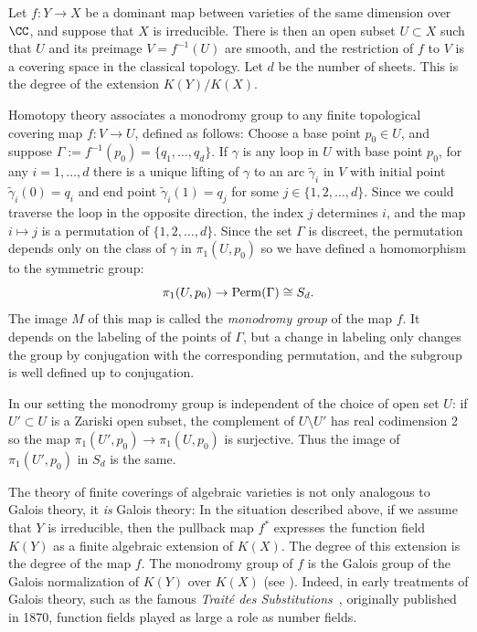 Let $f : Y \to X$ be a dominant map between varieties of the same dimension over $\CC$, and suppose that $X$ is irreducible. There is then an open subset $U \subset X$ such that $U$ and 
its preimage $V = f^{-1}(U)$ are smooth, and the restriction of $f$ to $V$ is a covering space in the classical topology. Let $d$ be the number of sheets. This is the degree of the extension $K(Y)/K(X)$. %

Homotopy theory  associates a monodromy group to any finite topological covering map $f : V \to U$, defined as follows: Choose a base point $p_0 \in U$, and suppose $\Gamma := f^{-1}(p_0)  = \{q_1,\dots,q_d\}$. If $\gamma$ is any loop in $U$ with base point $p_0$, for any $i = 1, \dots, d$ there is a unique lifting of $\gamma$ to an arc $\tilde \gamma_i$ in $V$ with initial point $\tilde \gamma_i(0) = q_i$ and end point $\tilde \gamma_i(1) = q_j$ for some $j \in \{1,2,\dots,d\}$. Since we could traverse the loop in the opposite direction, the index $j$ determines $i$, and the map $i\mapsto j$ is a permutation of $\{1,2,\dots,d\}$. 
Since the set $\Gamma$ is discreet, the permutation depends only on the class of $\gamma$ in $\pi_1(U,p_0)$ so we have defined a homomorphism to the symmetric group:
$$
\pi_1(U,p_0)  \to {\rm Perm}(\Gamma) \cong S_d.
$$
The image $M$ of this map is called the \emph{monodromy group} of the map $f$. It depends on the labeling of the points of $\Gamma$, but a change in labeling
only changes the group by conjugation with the corresponding permutation, and the subgroup is well defined up to 
conjugation.

\begin{fact}\label{Galois equals monodromy}
In our setting  the monodromy group is independent of the choice of open set $U$: if $U' \subset U$ is a Zariski open subset, the complement of $U\setminus U'$ has
real codimension 2 so the map $\pi_1(U', p_0) \to \pi_1(U,p_0)$ is surjective. Thus the image of $\pi_1(U', p_0)$ in $S_d$ is the same. 

The theory of finite coverings of algebraic varieties is not only analogous to Galois theory, it \emph{is} Galois theory: In the situation described above, if we assume that $Y$ is irreducible, then the pullback map $f^*$ expresses the function field $K(Y)$ as a finite algebraic extension of $K(X)$. The degree of this extension is the degree of the map $f$. The monodromy group of $f$  is the Galois group of the Galois normalization of $K(Y)$ over $K(X)$ (see \cite{Harris1979}). Indeed, in early treatments of Galois theory, such as the famous \emph{Trait\'e des Substitutions}~\cite{MR1188877}, originally published in 1870, function fields played as large a role as number fields.
\end{fact}

